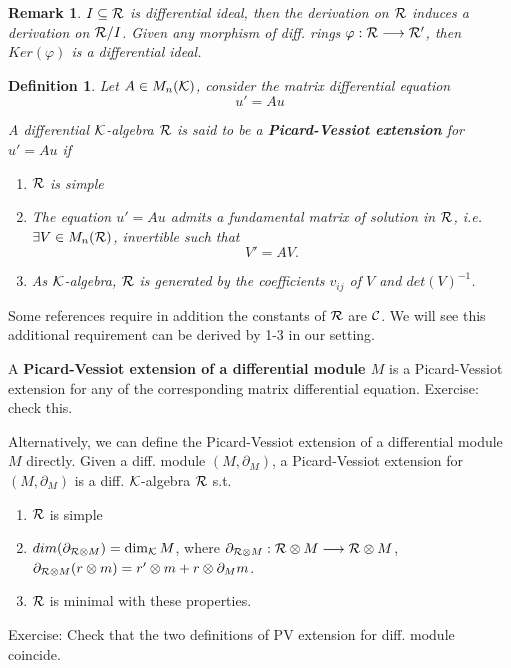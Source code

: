 \documentclass[11pt]{article}
\newtheorem{dfn}[thm]{Definition}
\newtheorem{rmk}[thm]{Remark}
\newcommand{\pd}{\partial}
\newcommand{\calc}{{\cal C}}
\newcommand{\calk}{{\cal K}}
\newcommand{\calr}{{\cal R}}
\newcommand{\lrta}{\longrightarrow}
\begin{document}
\begin{rmk}
$I\subseteq\calr$ is differential ideal, then the derivation on $\calr$ induces a derivation on $\calr/I$. Given any morphism of diff. rings $\varphi:\calr\lrta \calr'$, then $Ker(\varphi)$ is a differential ideal.
\end{rmk}

\begin{dfn}
Let $A\in M_n(\calk)$, consider the matrix differential equation
$$
u'=Au
$$

A differential $\calk$-algebra $\calr$ is said to be a \textbf{Picard-Vessiot extension} for  $u'=Au$ if
\begin{enumerate}
\item $\calr$ is simple 
\item The equation $u'=Au$ admits a fundamental matrix of solution in $\calr$, i.e. $\exists V\in M_n(\calr)$, invertible such that
$$
V'=AV.
$$
\item As $\calk$-algebra, $\calr$ is generated by the coefficients  $v_{ij}$ of $V$ and $det(V)^{-1}$.
\end{enumerate}
\end{dfn}
Some references require in addition the constants of $\calr$ are $\calc$. We will see this additional requirement can be derived by 1-3 in our setting.

A \textbf{Picard-Vessiot extension of a differential module $M$} is a Picard-Vessiot extension for any of the corresponding matrix differential equation. Exercise: check this.

Alternatively, we can define the Picard-Vessiot extension of a differential module $M$ directly. Given a diff. module $(M,\pd_M)$, a Picard-Vessiot extension for $(M,\pd_M)$ is a diff. $\calk$-algebra $\calr$ s.t.
\begin{enumerate}
\item $\calr$ is simple
\item $dim(\pd_{\calr\otimes M})=\dim_\calk M$, where $\pd_{\calr\otimes M}:\calr\otimes M\lrta \calr\otimes M $, $\pd_{\calr\otimes M}(r\otimes m)=r'\otimes m+r\otimes \pd_M m$. 
\item $\calr$ is minimal with these properties.
\end{enumerate}

Exercise: Check that the two definitions of PV extension for diff. module coincide.
\end{document}
